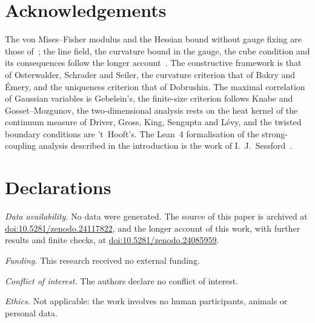 \section*{Acknowledgements}

The von Mises--Fisher modulus and the Hessian bound without gauge fixing are those
of~\cite{BB26a}; the line field, the curvature bound in the gauge, the cube
condition and its consequences follow the longer account~\cite{BBLR26,BBLRS26}.
The constructive framework is that of Osterwalder, Schrader and Seiler, the
curvature criterion that of Bakry and \'Emery, and the uniqueness criterion
that of Dobrushin. The maximal correlation of Gaussian variables is
Gebelein's, the finite-size criterion follows Knabe and Gosset--Mozgunov, the
two-dimensional analysis rests on the heat kernel of the continuum measure of
Driver, Gross, King, Sengupta and L\'evy, and the twisted boundary conditions
are 't~Hooft's. The Lean~4 formalisation of the strong-coupling analysis
described in the introduction is the work of I.~J.~Sessford~\cite{Ses26}.

\section*{Declarations}

\emph{Data availability.} No data were generated. The source of this paper is
archived at
\href{https://doi.org/10.5281/zenodo.24117822}{doi:10.5281/zenodo.24117822}, and
the longer account of this work, with further results and finite checks, at
\href{https://doi.org/10.5281/zenodo.24085959}{doi:10.5281/zenodo.24085959}.

\emph{Funding.} This research received no external funding.

\emph{Conflict of interest.} The authors declare no conflict of interest.

\emph{Ethics.} Not applicable: the work involves no human participants,
animals or personal data.


